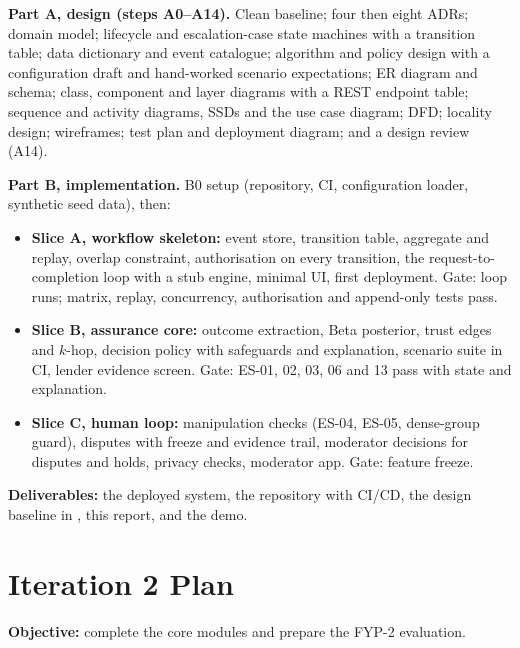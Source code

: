 \textbf{Part A, design (steps A0--A14).} Clean baseline; four then eight ADRs; domain model; lifecycle and escalation-case state machines with a transition table; data dictionary and event catalogue; algorithm and policy design with a configuration draft and hand-worked scenario expectations; ER diagram and schema; class, component and layer diagrams with a REST endpoint table; sequence and activity diagrams, SSDs and the use case diagram; DFD; locality design; wireframes; test plan and deployment diagram; and a design review (A14).

\textbf{Part B, implementation.} B0 setup (repository, CI, configuration loader, synthetic seed data), then:

\begin{itemize}
\item \textbf{Slice A, workflow skeleton:} event store, transition table, aggregate and replay, overlap constraint, authorisation on every transition, the request-to-completion loop with a stub engine, minimal UI, first deployment. Gate: loop runs; matrix, replay, concurrency, authorisation and append-only tests pass.
\item \textbf{Slice B, assurance core:} outcome extraction, Beta posterior, trust edges and $k$-hop, decision policy with safeguards and explanation, scenario suite in CI, lender evidence screen. Gate: ES-01, 02, 03, 06 and 13 pass with state and explanation.
\item \textbf{Slice C, human loop:} manipulation checks (ES-04, ES-05, dense-group guard), disputes with freeze and evidence trail, moderator decisions for disputes and holds, privacy checks, moderator app. Gate: feature freeze.
\end{itemize}

\textbf{Deliverables:} the deployed system, the repository with CI/CD, the design baseline in , this report, and the demo.

\section{Iteration 2 Plan}\label{sec:iteration-2-plan}
\textbf{Objective:} complete the core modules and prepare the FYP-2 evaluation.

